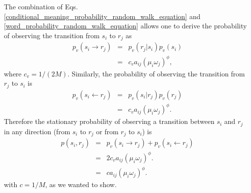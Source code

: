 \documentclass{article}
\begin{document}
The combination of Eqs. \ref{conditional_meaning_probability_random_walk_equation} and \ref{word_probability_random_walk_equation} allows one to derive the probability of observing the transition from $s_i$ to $r_j$ as
% 
\begin{eqnarray*}
p_{v}(s_i \rightarrow r_j) & = & p_{v}(r_j | s_i) p_{v}(s_i) \\
            & = & c_{v} a_{ij} (\mu_i \omega_j)^\phi,  
\end{eqnarray*}
where $c_{v} = 1/(2M)$. Similarly, the probability of observing the transition from $r_j$ to $s_i$ is 
\begin{eqnarray*}
p_{v}(s_i \leftarrow r_j) & = & p_{v}(s_i | r_j) p_{v}(r_j) \\
            & = & c_{v} a_{ij} (\mu_i \omega_j)^\phi.  
\end{eqnarray*}
Therefore the stationary probability of observing a transition between $s_i$ and $r_j$ in any direction (from $s_i$ to $r_j$ or from $r_j$ to $s_i$) is 
\begin{eqnarray*}
p(s_i, r_j) & = & p_{v}(s_i \rightarrow r_j) + p_{v}(s_i \leftarrow r_j) \\
            & = & 2c_v a_{ij} (\mu_i \omega_j)^\phi. \\
            & = & c a_{ij} (\mu_i \omega_j)^\phi.
\end{eqnarray*}
with $c=1/M$, as we wanted to show. 
\end{document}
